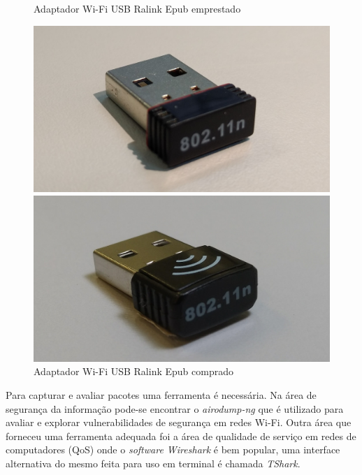 \begin{figure}[htb]
 \label{adaptadores-usb-2}
  \begin{minipage}{0.45\textwidth}
	  \centering
	  \caption{Adaptador Wi-Fi USB Ralink Epub emprestado \label{fig-ralink-epub}}
	  \includegraphics[width=1\textwidth]{040-plataformas/RPi-WiFi-dongles/cut_ralink-epub.jpg}
  \end{minipage}
  \hfill
  \begin{minipage}{0.45\textwidth}
	  \centering
	  \caption{Adaptador Wi-Fi USB Ralink Epub comprado \label{fig-ralink}}
	  \includegraphics[width=1\textwidth]{040-plataformas/RPi-WiFi-dongles/cut_ralink.jpg}
  \end{minipage}
\end{figure}


Para capturar e avaliar pacotes uma ferramenta é necessária. Na área
de segurança da informação pode-se encontrar o \emph{airodump-ng} que é utilizado para
avaliar e explorar vulnerabilidades de segurança em redes Wi-Fi. Outra área que
forneceu uma ferramenta adequada foi a área de qualidade de serviço em redes de
computadores (QoS) onde o \emph{software Wireshark} é bem popular, uma interface alternativa
do mesmo feita para uso em terminal é chamada \emph{TShark}.

